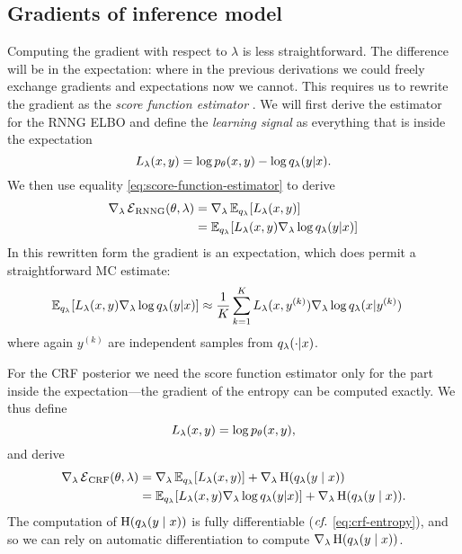   \subsection{Gradients of inference model}
    Computing the gradient with respect to $\lambda$ is less straightforward. The difference will be in the expectation: where in the previous derivations we could freely exchange gradients and expectations now we cannot. This requires us to rewrite the gradient as the \textit{score function estimator} \citep{fu2006gradient}.  We will first derive the estimator for the RNNG ELBO and define the \textit{learning signal} as everything that is inside the expectation
    \begin{equation}
      L_{\lambda}(x, y) = \log p_{\theta}(x, y) - \log q_{\lambda}(y | x).
    \end{equation}
    We then use equality \ref{eq:score-function-estimator} to derive
    \begin{align}
      \nabla_{\lambda} \operatorname{\mathcal{E}}_{\text{RNNG}}(\theta, \lambda)
        &= \nabla_{\lambda} \operatorname{\mathbb{E}}_{q_{\lambda}} [ L_{\lambda}(x, y) ]  \nonumber \\
        &= \operatorname{\mathbb{E}}_{q_{\lambda}} [ L_{\lambda}(x, y) \nabla_{\lambda} \log q_{\lambda}(y | x) ]
    \end{align}
    In this rewritten form the gradient is an expectation, which does permit a straightforward MC estimate:
    \begin{align}
      \operatorname{\mathbb{E}}_{q_{\lambda}} [ L_{\lambda}(x, y) \nabla_{\lambda} \log q_{\lambda}(y | x) ]
        &\approx \frac{1}{K}\sum_{k=1}^K  L_{\lambda}(x, y^{(k)})\nabla_{\lambda} \log q_{\lambda}(x | y^{(k)})
    \end{align}
    where again $y^{(k)}$ are independent samples from $q_{\lambda}(\cdot | x)$.

    For the CRF posterior we need the score function estimator only for the part inside the expectation---the gradient of the entropy can be computed exactly. We thus define
    \begin{equation}
      L_{\lambda}(x, y) = \log p_{\theta}(x, y),
    \end{equation}
    and derive
    \begin{align}
      \nabla_{\lambda} \operatorname{\mathcal{E}}_{\text{CRF}}(\theta, \lambda)
        &= \nabla_{\lambda} \operatorname{\mathbb{E}}_{q_{\lambda}} [ L_{\lambda}(x, y) ] +  \nabla_{\lambda} \operatorname{H}(q_{\lambda}(y \mid x))  \nonumber  \\
        &= \operatorname{\mathbb{E}}_{q_{\lambda}} [ L_{\lambda}(x, y) \nabla_{\lambda} \log q_{\lambda}(y | x) ] + \nabla_{\lambda} \operatorname{H}(q_{\lambda}(y \mid x)).
    \end{align}
    The computation of $\operatorname{H}(q_{\lambda}(y \mid x))$ is fully differentiable ($\emph{cf.}$ \ref{eq:crf-entropy}), and so we can rely on automatic differentiation to compute $\nabla_{\lambda} \operatorname{H}(q_{\lambda}(y \mid x))$.

